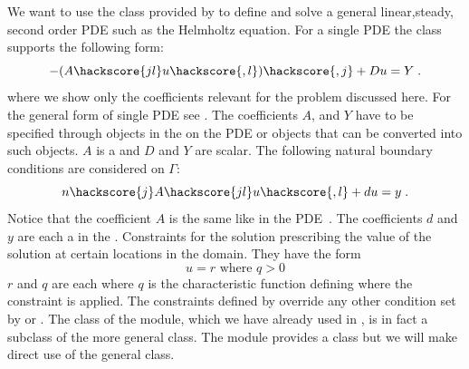 We want to use the \LinearPDE class provided by \escript to define and solve a general linear,steady, second order PDE such as the 
Helmholtz equation. For a single PDE the \LinearPDE class supports the following form:
\begin{equation}\label{LINEARPDE.SINGLE.1 TUTORIAL}
-(A\hackscore{jl} u\hackscore{,l})\hackscore{,j}+D u = Y \; .
\end{equation}
where we show only the coefficients relevant for the problem discussed here. For the general form of 
single PDE see . 
The coefficients $A$, and $Y$ have to be specified through \Data objects in the 
\Function on the PDE or objects that can be converted into such \Data objects. 
$A$ is a \RankTwo and $D$ and $Y$ are scalar. 
The following natural
boundary conditions are considered  on $\Gamma$:
\begin{equation}\label{LINEARPDE.SINGLE.2 TUTORIAL}
n\hackscore{j}A\hackscore{jl} u\hackscore{,l}+d u= y  \;.
\end{equation}
Notice that the coefficient $A$ is the same like in the PDE~. 
The coefficients $d$ and $y$ are  
each a \Scalar in the \FunctionOnBoundary.  Constraints  for the solution prescribing the value of the 
solution at certain locations in the domain. They have the form
\begin{equation}\label{LINEARPDE.SINGLE.3 TUTORIAL}
u=r \mbox{ where } q>0
\end{equation}
$r$ and $q$ are each \Scalar where $q$ is the characteristic function
 defining where the constraint is applied.
The constraints defined by  override any other condition set by 
 or . 
The \Poisson class of the \linearPDEs module,
which we have already used in , is in fact a subclass of the more general
\LinearPDE class. The \linearPDEs module provides a \Helmholtz class but
we will make direct use of the general \LinearPDE class.

